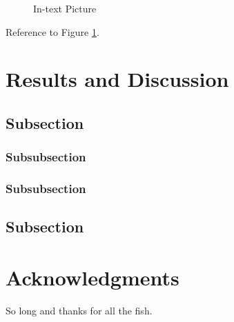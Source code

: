 \documentclass[fleqn,10pt,lineno]{wlpeerj} %
\begin{document}
\lipsum[9] %

\begin{figure}[ht]\centering
\caption{In-text Picture}
\label{fig:results}
\end{figure}

Reference to Figure \ref{fig:results}.

\section*{Results and Discussion}

\lipsum[10] %

\subsection*{Subsection}

\lipsum[11] %

\subsubsection*{Subsubsection}

\lipsum[12] %

\subsubsection*{Subsubsection}

\lipsum[14] %

\subsection*{Subsection}

\lipsum[15-20] %

\section*{Acknowledgments}

So long and thanks for all the fish.


\end{document}
